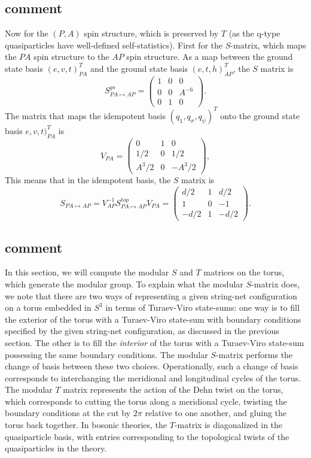 \documentclass[12pt,a4paper]{article}
\newcommand{\unit}{\mathds{1}}
\newcommand\be            {\begin{equation}}
\newcommand\ee            {\end{equation}}
\begin{document}
\subsection{comment}
Now for the $(P,A)$ spin structure, which is preserved by $T$ (as the q-type quasiparticles have well-defined self-statistics). 
First for the $S$-matrix, which maps the $PA$ spin structure to the $AP$ spin structure. As a map between the ground state basis $(e,v,t)_{PA}^T$ and the ground state basis $(e,t,h)_{AP}^T$, the $S$ matrix is
\be S^{gs}_{PA\mapsto AP} = \begin{pmatrix}
1 & 0& 0 \\ 0 & 0 & A^{-6} \\ 0&1& 0
\end{pmatrix}.\ee
The matrix that maps the idempotent basis $(q_\unit,q_\sigma,q_\psi)^T$ onto the ground state basis $e,v,t)_{PA}^T$ is 
\be V_{PA} = \begin{pmatrix}
0 & 1 & 0 \\ 1/2 & 0 & 1/2 \\ A^3/2 & 0 & -A^3/2
\end{pmatrix},\ee
This means that in the idempotent basis, the $S$ matrix is 
\be S_{PA \mapsto AP} = V_{AP}^{-1} S^{top}_{PA \mapsto AP} V_{PA} = \begin{pmatrix}
d/2 & 1 & d/2 \\ 1 & 0 & -1 \\ -d/2 & 1 & -d/2
\end{pmatrix}.\ee
 
 


 
\subsection{comment}
In this section, we will compute the modular $S$ and $T$ matrices on the torus, which generate the modular group. 
To explain what the modular $S$-matrix does, we note that there are two ways of representing a given string-net configuration on a torus embedded in $S^3$ in terms of Turaev-Viro state-sums: one way is to fill the exterior of the torus with a Turaev-Viro state-sum with boundary conditions specified by the given string-net configuration, as discussed in the previous section. 
The other is to fill the {\it interior} of the torus with a Turaev-Viro state-sum possessing the same boundary conditions. 
The modular $S$-matrix performs the change of basis between these two choices. 
Operationally, such a change of basis corresponds to interchanging the meridional and longitudinal cycles of the torus. 
The modular $T$ matrix represents the action of the Dehn twist on the torus, which corresponds to cutting the torus along a meridional cycle, twisting the boundary conditions at the cut by $2\pi$ relative to one another, and gluing the torus back together.
In bosonic theories, the $T$-matrix is diagonalized in the quasiparticle basis, with entries corresponding to the topological twists of the quasiparticles in the theory. 
\end{document}
